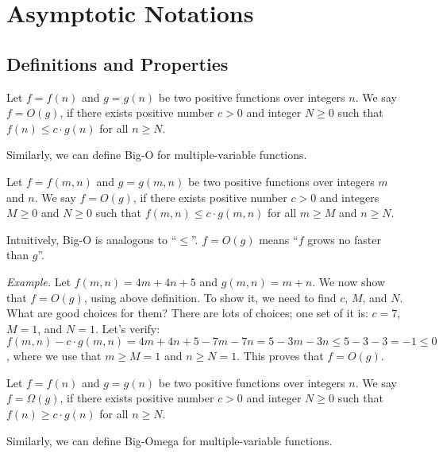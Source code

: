 \setcounter{definition}{0} \setcounter{property}{0} \setcounter{claim}{0} \setcounter{fact}{0} \setcounter{corollary}{0} \setcounter{figure}{0}
\section{Asymptotic Notations}

\subsection*{Definitions and Properties}

\begin{definition}[Big-O]
Let $f = f(n)$ and $g=g(n)$ be two positive functions over integers $n$.
We say $f = O(g)$, if there exists positive number $c > 0$ and integer $N \ge 0$
such that $f(n) \le c\cdot g(n)$ for all $n\ge N$.
\end{definition}

Similarly, we can define Big-O for multiple-variable functions.

\begin{definition}[Big-O]
Let $f = f(m,n)$ and $g=g(m,n)$ be two positive functions over integers $m$ and $n$.
We say $f = O(g)$, if there exists positive number $c > 0$ and integers $M\ge 0$ and $N \ge 0$
such that $f(m,n) \le c\cdot g(m,n)$ for all $m\ge M$ and $n\ge N$.
\end{definition}

Intuitively, Big-O is analogous to ``$\le$''.
$f=O(g)$ means ``$f$ grows no faster than $g$''.

\emph{Example.} Let $f(m,n) = 4m + 4n + 5$ and $g(m,n) = m + n$. We now show that $f = O(g)$,
using above definition. To show it, we need to find $c$, $M$, and $N$. What are good choices for them?
There are lots of choices; one set of it is: $c = 7$, $M = 1$, and $N = 1$.
Let's verify: $f(m,n) - c\cdot g(m,n) = 4m + 4n + 5 - 7m - 7n = 5 - 3m - 3n \le 5 - 3 - 3 = -1 \le 0$,
where we use that $m \ge M = 1$ and $n \ge N = 1$. This proves that $f = O(g)$.

\begin{definition}
Let $f = f(n)$ and $g=g(n)$ be two positive functions over integers $n$.
We say $f = \Omega(g)$, if there exists positive number $c > 0$ and integer $N \ge 0$
such that $f(n) \ge c\cdot g(n)$ for all $n\ge N$.
\end{definition}

Similarly, we can define Big-Omega for multiple-variable functions.

